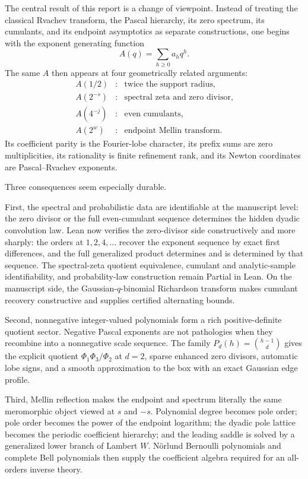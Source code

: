 \documentclass[11pt,oneside]{article}
\numberwithin{equation}{section}
\theoremstyle{definition}
\theoremstyle{remark}
\begin{document}
The central result of this report is a change of viewpoint.  Instead of treating the
classical Rvachev transform, the Pascal hierarchy, its zero spectrum, its cumulants, and its
endpoint asymptotics as separate constructions, one begins with the exponent generating
function
\[
 A(q)=\sum_{h\ge0}a_hq^h.
\]
The same $A$ then appears at four geometrically related arguments:
\begin{equation}
 \begin{array}{ccl}
 A(1/2) &:& \text{twice the support radius},\\
 A(2^{-s}) &:& \text{spectral zeta and zero divisor},\\
 A(4^{-j}) &:& \text{even cumulants},\\
 A(2^w) &:& \text{endpoint Mellin transform}.
 \end{array}
 \label{p1:eq:four-samples-summary}
\end{equation}
Its coefficient parity is the Fourier-lobe character, its prefix sums are zero
multiplicities, its rationality is finite refinement rank, and its Newton coordinates are
Pascal--Rvachev exponents.

Three consequences seem especially durable.

First, the spectral and probabilistic data are identifiable at the manuscript level: the
zero divisor or the full even-cumulant sequence determines the hidden dyadic convolution
law.  Lean now verifies the zero-divisor side constructively and more sharply: the orders at
$1,2,4,\ldots$ recover the exponent sequence by exact first differences, and the full
generalized product determines and is determined by that sequence.  The spectral-zeta
quotient equivalence, cumulant and analytic-sample identifiability, and probability-law
construction remain Partial in Lean.  On the manuscript side, the Gaussian-$q$-binomial
Richardson transform makes cumulant recovery constructive and supplies certified alternating
bounds.

Second, nonnegative integer-valued polynomials form a rich positive-definite quotient sector.
Negative Pascal exponents are not pathologies when they recombine into a nonnegative scale
sequence.  The family
$P_d(h)=\binom{h-1}{d}$ gives the explicit quotient
$\Phi_1\Phi_3/\Phi_2$ at $d=2$, sparse enhanced zero divisors, automatic lobe signs, and a
smooth approximation to the box with an exact Gaussian edge profile.

Third, Mellin reflection makes the endpoint and spectrum literally the same meromorphic
object viewed at $s$ and $-s$.  Polynomial degree becomes pole order; pole order becomes the
power of the endpoint logarithm; the dyadic pole lattice becomes the periodic coefficient
hierarchy; and the leading saddle is solved by a generalized lower branch of Lambert $W$.
N\"orlund Bernoulli polynomials and complete Bell polynomials then supply the coefficient
algebra required for an all-orders inverse theory.
\end{document}
